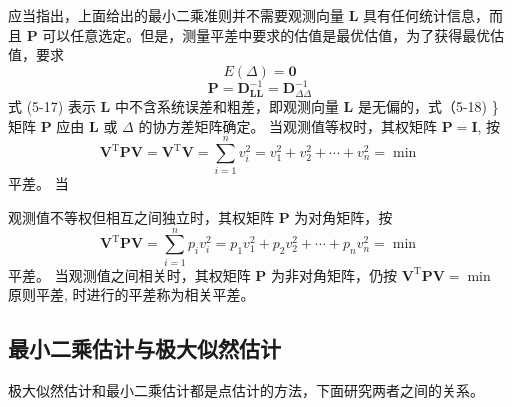 \documentclass[12pt]{article}
\begin{document}
应当指出，上面给出的最小二乘准则并不需要观测向量 $\bm{L}$ 具有任何统计信息，而且 $\bm{P}$ 可以任意选定。但是，测量平差中要求的估值是最优估值，为了获得最优估值，要求
\begin{equation}
	E(\Delta) = \bm{0}
\end{equation}
\begin{equation}
	\bm{P}=\bm{D}_{\bm{LL}}^{-1}=\bm{D}_{\Delta\Delta}^{-1}
\end{equation}
式 (5-17) 表示 $\bm{L}$ 中不含系统误差和粗差，即观测向量 $\bm{L}$ 是无偏的，式（5-18) \}
矩阵 $\bm{P}$ 应由 $\bm{L}$ 或 $\Delta$ 的协方差矩阵确定。 当观测值等权时，其权矩阵 $\bm{P}=\bm{I}$, 按
\begin{equation}
	\bm{V}^{\mathrm{T}} \bm{P} \bm{V}=\bm{V}^{\mathrm{T}} \bm{V}=\sum_{i=1}^{n} v_{i}^{2}=v_{1}^{2}+v_{2}^{2}+\cdots+v^2_n=\min
\end{equation}
平差。 当

观测值不等权但相互之间独立时，其权矩阵 $\bm{P}$ 为对角矩阵，按
\begin{equation}
	\bm{V}^{\mathrm{T}} \bm{P V}=\sum_{i=1}^{n} p_{i} v_{i}^{2}=p_{1} v_{1}^{2}+p_{2} v_{2}^{2}+\cdots+p_{n} v_{n}^{2}=\min
\end{equation}
平差。 当观测值之间相关时，其权矩阵 $\bm{P}$ 为非对角矩阵，仍按 $\bm{V}^{\mathrm{T}} \bm{P} \bm{V}=\min$ 原则平差,
时进行的平差称为相关平差。

\subsection{最小二乘估计与极大似然估计}

极大似然估计和最小二乘估计都是点估计的方法，下面研究两者之间的关系。
\end{document}
